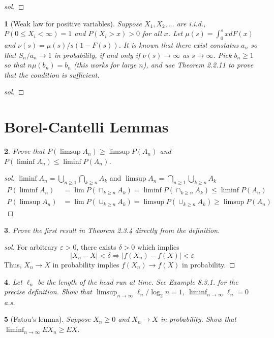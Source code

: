 \documentclass{report}
\newtheorem{ex}{}[section]
\begin{document}
\begin{proof}[sol]
\end{proof}
\begin{ex}[Weak law for positive variables] Suppose $X_1,X_2,...$ are i.i.d., $P(0\le X_i < \infty) = 1$ and $P(X_i > x) > 0$ for all $x$. Let $\mu(s) = \int_0^s xdF(x)$ and $\nu(s) = \mu(s)/s(1 -F(s))$. It is known that there exist constatns $a_n$ so that $S_n/a_n \to 1$ in probability, if and only if $\nu(s) \to\infty$ as $s \to \infty$. Pick $b_n \ge 1$ so that $n\mu(b_n) = b_n$ (this works for large $n$), and use Theorem 2.2.11 to prove that the condition is sufficient.
\end{ex}
\begin{proof}[sol]
\end{proof}
\section{Borel-Cantelli Lemmas}
\begin{ex}
Prove that $P(\limsup A_n) \ge \limsup P(A_n)$ and $P(\liminf A_n) \le \liminf P(A_n)$.
\end{ex}
\begin{proof}[sol]
$\liminf A_n = \bigcup_{n\ge 1}\bigcap_{k \ge n}A_k$ and $\limsup A_n = \bigcap_{n\ge 1}\bigcup_{k \ge n}A_k$
\begin{align*}
P(\liminf A_n) &= \lim P(\cap_{k \ge n}A_k) = \liminf P(\cap_{k \ge n}A_k) \le \liminf P(A_n)\\
P(\limsup A_n) &= \lim P(\cup_{k \ge n}A_k) = \limsup P(\cup_{k \ge n}A_k) \ge \limsup P(A_n)
\end{align*}
\end{proof}
\begin{ex}
Prove the first result in Theorem 2.3.4 directly from the definition.
\end{ex}
\begin{proof}[sol]
For arbitrary $\varepsilon > 0$, there exists $\delta > 0$ which implies
\[|X_n - X| < \delta \Rightarrow |f(X_n) - f(X)| < \varepsilon\]
Thus, $X_n \to X$ in probability implies $f(X_n) \to f(X)$ in probability.
\end{proof}
\begin{ex}
Let $\ell_n$ be the length of the head run at time. See Example 8.3.1. for the precise definition. Show that $\limsup_{n\to\infty} \ell_n /\log_2 n = 1$, $\liminf_{n\to\infty} \ell_n = 0$ a.s.
\end{ex}
\begin{ex}[Fatou's lemma]
Suppose $X_n \ge 0$ and $X_n \to X$ in probability. Show that $\liminf_{n\to\infty} EX_n \ge EX$.
\end{ex}
\end{document}

